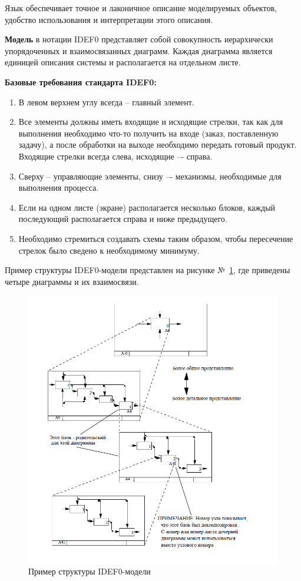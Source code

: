\documentclass[a4paper, final]{article}
\begin{document}
Язык обеспечивает точное и лаконичное описание моделируемых объектов, удобство использования и интерпретации этого описания.

{\bf Модель} в нотации IDEF0 представляет собой совокупность иерархически упорядоченных и взаимосвязанных диаграмм. 
Каждая диаграмма является единицей описания системы и располагается на отдельном листе.


{\bf Базовые требования стандарта IDEF0:}
\begin{enumerate}
	\item В левом верхнем углу всегда -- главный элемент.
	\item Все элементы должны иметь входящие и исходящие стрелки, так как для выполнения необходимо что-то
	получить на входе (заказ, поставленную задачу), а после обработки на выходе необходимо передать готовый
	продукт. Входящие стрелки всегда слева, исходящие –- справа.
	\item Сверху – управляющие элементы, снизу –- механизмы, необходимые для выполнения процесса.
	\item Если на одном листе (экране) располагается несколько блоков, каждый последующий располагается справа
	и ниже предыдущего.
	\item Необходимо стремиться создавать схемы таким образом, чтобы пересечение стрелок 
	было сведено к необходимому минимуму. \cite{bib:gost_idef0}
\end{enumerate}

\par Пример структуры IDEF0-модели представлен на рисунке №~\ref{img:struct}, где приведены четыре диаграммы и их 
взаимосвязи.
\newpage
\begin{figure}[H]
	\centering
	\includegraphics[scale = 0.7]{struct.png}
	\caption{Пример структуры IDEF0-модели}
	\label{img:struct}
\end{figure}
\end{document}
